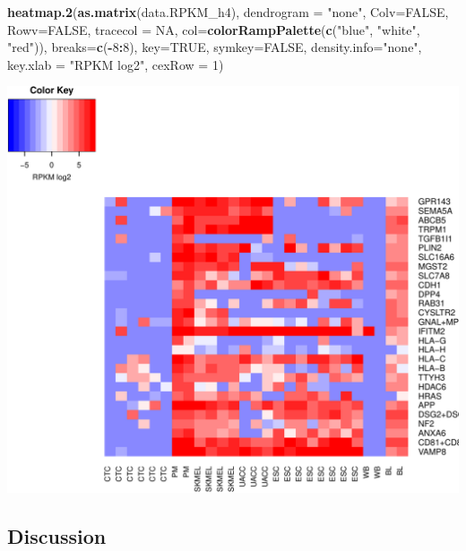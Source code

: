 \documentclass[]{article}
\newenvironment{Shaded}{\begin{snugshade}}{\end{snugshade}}
\newcommand{\KeywordTok}[1]{\textcolor[rgb]{0.13,0.29,0.53}{\textbf{#1}}}
\newcommand{\DataTypeTok}[1]{\textcolor[rgb]{0.13,0.29,0.53}{#1}}
\newcommand{\DecValTok}[1]{\textcolor[rgb]{0.00,0.00,0.81}{#1}}
\newcommand{\StringTok}[1]{\textcolor[rgb]{0.31,0.60,0.02}{#1}}
\newcommand{\OtherTok}[1]{\textcolor[rgb]{0.56,0.35,0.01}{#1}}
\newcommand{\OperatorTok}[1]{\textcolor[rgb]{0.81,0.36,0.00}{\textbf{#1}}}
\newcommand{\NormalTok}[1]{#1}
\begin{document}
\begin{Shaded}
\begin{Highlighting}[]
\KeywordTok{heatmap.2}\NormalTok{(}\KeywordTok{as.matrix}\NormalTok{(data.RPKM_h4), }\DataTypeTok{dendrogram =} \StringTok{"none"}\NormalTok{, }\DataTypeTok{Colv=}\OtherTok{FALSE}\NormalTok{, }\DataTypeTok{Rowv=}\OtherTok{FALSE}\NormalTok{,}
          \DataTypeTok{tracecol =} \OtherTok{NA}\NormalTok{, }\DataTypeTok{col=}\KeywordTok{colorRampPalette}\NormalTok{(}\KeywordTok{c}\NormalTok{(}\StringTok{"blue"}\NormalTok{, }\StringTok{"white"}\NormalTok{, }\StringTok{"red"}\NormalTok{)),}
          \DataTypeTok{breaks=}\KeywordTok{c}\NormalTok{(}\OperatorTok{-}\DecValTok{8}\OperatorTok{:}\DecValTok{8}\NormalTok{), }\DataTypeTok{key=}\OtherTok{TRUE}\NormalTok{, }\DataTypeTok{symkey=}\OtherTok{FALSE}\NormalTok{, }\DataTypeTok{density.info=}\StringTok{"none"}\NormalTok{,}
          \DataTypeTok{key.xlab =} \StringTok{"RPKM log2"}\NormalTok{, }\DataTypeTok{cexRow =} \DecValTok{1}\NormalTok{)}
\end{Highlighting}
\end{Shaded}

\includegraphics{Project_jankauskaite_ugne_files/figure-latex/unnamed-chunk-43-1.pdf}

\subsection{Discussion}\label{discussion}
\end{document}
